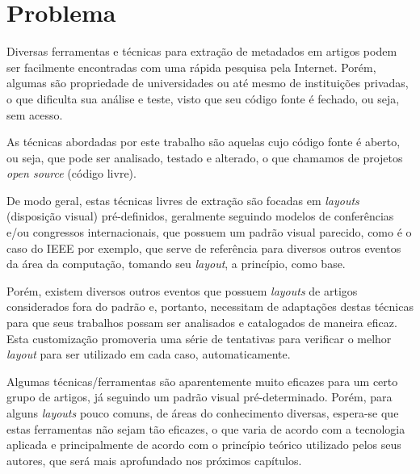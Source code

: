 \section{Problema}


\begin{textonovo}
Diversas ferramentas e técnicas para extração de metadados em artigos podem ser facilmente encontradas com uma rápida pesquisa pela Internet. Porém, algumas são propriedade de universidades ou até mesmo de instituições privadas, o que dificulta sua análise e teste, visto que seu código fonte é fechado, ou seja, sem acesso.
\end{textonovo}

\begin{textoalterado}
As técnicas abordadas por este trabalho são aquelas cujo código fonte é aberto, ou seja, que pode ser analisado, testado e alterado, o que chamamos de projetos \textit{open source} (código livre).
\end{textoalterado}

De modo geral, estas técnicas livres de extração são focadas em \textit{layouts} (disposição visual) pré-definidos, geralmente seguindo modelos de conferências e/ou congressos internacionais, que possuem um padrão visual parecido, como é o caso do IEEE por exemplo, que serve de referência para diversos outros eventos da área da computação, tomando seu \textit{layout}, a princípio, como base.

Porém, existem diversos outros eventos que possuem \textit{layouts} de artigos considerados fora do padrão e, portanto, necessitam de adaptações destas técnicas para que seus trabalhos possam ser analisados e catalogados de maneira eficaz. Esta customização promoveria uma série de tentativas para verificar o melhor \textit{layout} para ser utilizado em cada caso, automaticamente.

\begin{textoalterado}
Algumas técnicas/ferramentas são aparentemente muito eficazes para um certo grupo de artigos, já seguindo um padrão visual pré-determinado. Porém, para alguns \textit{layouts} pouco comuns, de áreas do conhecimento diversas, espera-se que estas ferramentas não sejam tão eficazes, o que varia de acordo com a tecnologia aplicada e principalmente de acordo com o princípio teórico utilizado pelos seus autores, que será mais aprofundado nos próximos capítulos.
\end{textoalterado}

